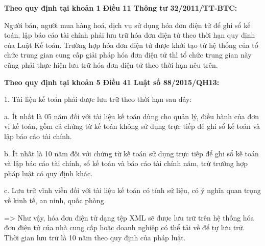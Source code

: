 
 
\textbf{Theo quy định tại khoản 1 Điều 11 Thông tư 32/2011/TT-BTC:} 




 
  

  Người bán, người mua hàng hoá, dịch vụ sử dụng hóa đơn điện tử để ghi sổ kế toán, lập báo cáo tài chính phải lưu trữ hóa đơn điện tử theo thời hạn quy định của Luật Kế toán. Trường hợp hóa đơn điện tử được khởi tạo từ hệ thống của tổ chức trung gian cung cấp giải pháp hóa đơn điện tử thì tổ chức trung gian này cũng phải thực hiện lưu trữ hóa đơn điện tử theo thời hạn nêu trên.
  
\textbf{Theo quy định tại khoản 5 Điều 41 Luật số 88/2015/QH13:} 

  
  1. Tài liệu kế toán phải được lưu trữ theo thời hạn sau đây:
  
  a. Ít nhất là 05 năm đối với tài liệu kế toán dùng cho quản lý, điều hành của đơn vị kế toán, gồm cả chứng từ kế toán không sử dụng trực tiếp để ghi sổ kế toán và lập báo cáo tài chính.
  
  b. Ít nhất là 10 năm đối với chứng từ kế toán sử dụng trực tiếp để ghi sổ kế toán và lập báo cáo tài chính, sổ kế toán và báo cáo tài chính năm, trừ trường hợp pháp luật có quy định khác.
  
  c. Lưu trữ vĩnh viễn đối với tài liệu kế toán có tính sử liệu, có ý nghĩa quan trọng về kinh tế, an ninh, quốc phòng.
  
  => Như vậy, hóa đơn điện tử dạng tệp XML sẽ được lưu trữ trên hệ thống hóa đơn điện tử của nhà cung cấp hoặc doanh nghiệp có thể tải về để tự lưu trữ. Thời gian lưu trữ là 10 năm theo quy định của pháp luật.
  